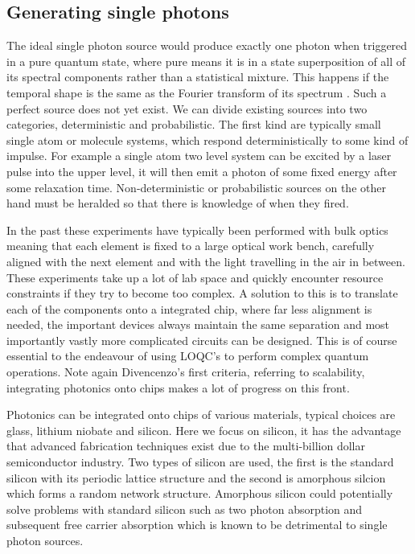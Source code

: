 \subsection{Generating single photons}
The ideal single photon source would produce exactly one photon when triggered in a pure quantum state, where pure means it is in a state superposition of all of its spectral components rather than a statistical mixture. This happens if the temporal shape is the same as the Fourier transform of its spectrum \cite{uren_generation_2007}. Such a perfect source does not yet exist. We can divide existing sources into two categories, deterministic and probabilistic\cite{eisaman_invited_2011}. The first kind are typically small single atom or molecule systems, which respond deterministically to some kind of impulse. For example a single atom two level system can be excited by a laser pulse into the upper level, it will then emit a photon of some fixed energy after some relaxation time. Non-deterministic or probabilistic sources on the other hand must be heralded so that there is knowledge of when they fired. 


In the past these experiments have typically been performed with bulk optics meaning that each element is fixed to a large optical work bench, carefully aligned with the next element and with the light travelling in the air in between. These experiments take up a lot of lab space and quickly encounter resource constraints if they try to become too complex. A solution to this is to translate each of the components onto a integrated chip, where far less alignment is needed, the important devices always maintain the same separation and most importantly vastly more complicated circuits can be designed. This is of course essential to the endeavour of using LOQC's to perform complex quantum operations. Note again Divencenzo's first criteria, referring to scalability, integrating photonics onto chips makes a lot of progress on this front.

Photonics can be integrated onto chips of various materials, typical choices are glass, lithium niobate and silicon. Here we focus on silicon, it has the advantage that advanced fabrication techniques exist due to the multi-billion dollar semiconductor industry. Two types of silicon are used, the first is the standard silicon with its periodic lattice structure and the second is amorphous silcion which forms a random network structure. Amorphous silicon could potentially solve problems with standard silicon such as two photon absorption and subsequent free carrier absorption which is known to be detrimental to single photon sources.

